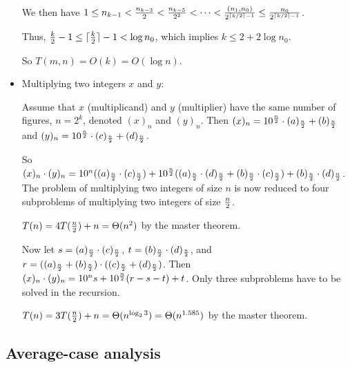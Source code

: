 \documentclass{article}
\begin{document}
\begin{itemize}
We then have $1\le n_{k-1}<{n_{k-3}\over2}<{n_{k-5}\over2^2}<\cdots<
{(n_1,n_0)\over2^{\lceil k/2\rceil-1}}\le {n_0\over2^{\lceil k/2\rceil-1}}$.

Thus, ${k\over2}-1\le\lceil{k\over2}\rceil-1<\log n_0$,
which implies $k\le 2+2\log n_0$.

So $T(m,n)=O(k)=O(\log n)$.

\item Multiplying two integers $x$ and $y$: 

Assume that $x$ (multiplicand) and $y$ (multiplier) 
have the same number of figures, $n=2^k$,
denoted $(x)_n$ and $(y)_n$.
Then $(x)_n=10^{n\over2}\cdot(a)_{n\over2}+(b)_{n\over2}$ and
$(y)_n=10^{n\over2}\cdot(c)_{n\over2}+(d)_{n\over2}$.

So $(x)_n\cdot(y)_n=10^n((a)_{n\over2}\cdot (c)_{n\over2})+
10^{n\over2}((a)_{n\over2}\cdot (d)_{n\over2}+ (b)_{n\over2}\cdot
(c)_{n\over2})+(b)_{n\over2}\cdot (d)_{n\over2}$. The problem of 
multiplying two integers of size $n$ is now reduced to four subproblems
of multiplying two integers of size $n\over2$.

$T(n)=4T({n\over2})+n=\Theta(n^2)$ by the master theorem.

Now let $s=(a)_{n\over2}\cdot (c)_{n\over2}$,
$t=(b)_{n\over2}\cdot (d)_{n\over2}$, and
$r=((a)_{n\over2}+(b)_{n\over2})\cdot((c)_{n\over2}+(d)_{n\over2})$.
Then $(x)_n\cdot(y)_n=10^ns+10^{n\over2}(r-s-t)+t$. Only three
subproblems have to be solved in the recursion.

$T(n)=3T({n\over2})+n=\Theta(n^{\log_23})=\Theta(n^{1.585})$ 
by the master theorem.
\end{itemize}

\subsection{Average-case analysis}

\end{document}
